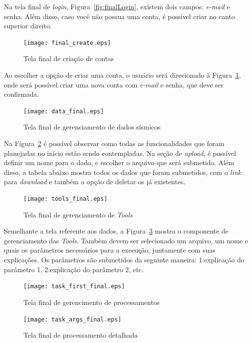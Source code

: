 \documentclass[11pt,twoside]{article}
\begin{document}
Na tela final de \emph{login}, Figura~\ref{fig:finalLogin}, existem dois campos: \emph{e-mail} e senha. Além disso, caso você não possua uma conta, é possível criar no canto superior direito.

\begin{figure}[!h]
  \centering
  \texttt{[image: final\_create.eps]}
  \caption{Tela final de criação de contas}
  \label{fig:finalCreate}
\end{figure}

 Ao escolher a opção de criar uma conta, o usuário será direcionado à Figura~\ref{fig:finalCreate}, onde será possível criar uma nova conta com \emph{e-mail} e senha, que deve ser confirmada.

\begin{figure}[!h]
  \centering
  \texttt{[image: data\_final.eps]}
  \caption{Tela final de gerenciamento de dados sísmicos}
  \label{fig:finalData}
\end{figure}

Na Figura~\ref{fig:finalData} é possível observar como todas as funcionalidades que foram planejadas no início estão sendo contempladas. Na seção de \emph{upload}, é possível definir um nome para o dado, e escolher o 
arquivo que será submetido. Além disso, a tabela abaixo mostra todos os dados que foram submetidos, com o \emph{link} para \emph{download} e também a opção de deletar os já existentes.

\begin{figure}[!h]
  \centering
  \texttt{[image: tools\_final.eps]}
  \caption{Tela final de gerenciamento de \emph{Tools}}
  \label{fig:finalTools}
\end{figure}

Semelhante a tela referente aos dados, a Figura~\ref{fig:finalTools} mostra o componente de gerenciamento das \emph{Tools}. Também devem
ser selecionado um arquivo, um nome e quais os parâmetros necessários para a execução, juntamente com suas explicações. Os parâmetros são submetidos da seguinte maneira: 1:explicação do parâmetro 1,
2:explicação do parâmetro 2, etc.

\begin{figure}[!h]
  \centering
  \texttt{[image: task\_first\_final.eps]}
  \caption{Tela final de gerencimento de processamentos}
  \label{fig:finalTasks}
\end{figure}

\begin{figure}[!h]
  \centering
  \texttt{[image: task\_args\_final.eps]}
  \caption{Tela final de processamento detalhada}
  \label{fig:finalDetailedTask}
\end{figure}
\end{document}
